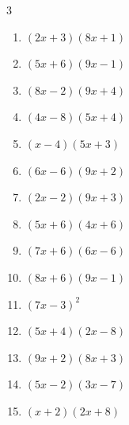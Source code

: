 \begin{multicols}{3}
\begin{enumerate}
  \item $(2x+3)(8x+1)$


  \item $(5x+6)(9x-1)$


\columnbreak %

  \item $(8x-2)(9x+4)$


  \item $(4x-8)(5x+4)$


  \item $(x-4)(5x+3)$


  \item $(6x-6)(9x+2)$


  \item $(2x-2)(9x+3)$


  \item $(5x+6)(4x+6)$


  \item $(7x+6)(6x-6)$


  \item $(8x+6)(9x-1)$


  \item $(7x-3)^{2}$


  \item $(5x+4)(2x-8)$


  \item $(9x+2)(8x+3)$


  \item $(5x-2)(3x-7)$


  \item $(x+2)(2x+8)$


\end{enumerate}
\end{multicols}
